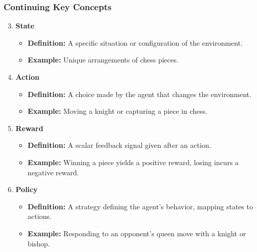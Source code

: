 \documentclass[aspectratio=169]{beamer}
\begin{document}
\begin{frame}[fragile]
    \frametitle{Continuing Key Concepts}
    \begin{enumerate}
        \setcounter{enumi}{2} %
        
        \item \textbf{State}
        \begin{itemize}
            \item \textbf{Definition:} A specific situation or configuration of the environment.
            \item \textbf{Example:} Unique arrangements of chess pieces.
        \end{itemize}

        \item \textbf{Action}
        \begin{itemize}
            \item \textbf{Definition:} A choice made by the agent that changes the environment.
            \item \textbf{Example:} Moving a knight or capturing a piece in chess.
        \end{itemize}
        
        \item \textbf{Reward}
        \begin{itemize}
            \item \textbf{Definition:} A scalar feedback signal given after an action.
            \item \textbf{Example:} Winning a piece yields a positive reward, losing incurs a negative reward.
        \end{itemize}

        \item \textbf{Policy}
        \begin{itemize}
            \item \textbf{Definition:} A strategy defining the agent's behavior, mapping states to actions.
            \item \textbf{Example:} Responding to an opponent's queen move with a knight or bishop.
        \end{itemize}
    \end{enumerate}
\end{frame}
\end{document}
